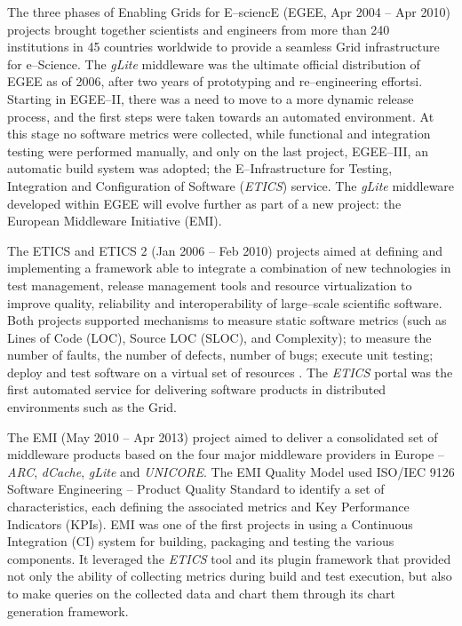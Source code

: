 \documentclass[journal]{IEEEtran}
\begin{document}
The three phases of Enabling Grids for E--sciencE (EGEE, Apr 2004 -- Apr 2010) \cite{cordis:egee, cordis:egee2, cordis:egee3} projects brought together scientists and engineers from more than 240 institutions in 45 countries worldwide to provide a seamless Grid infrastructure for e--Science. The {\sl gLite} middleware \cite{glite} was the ultimate official distribution of EGEE as of 2006, after two years of prototyping and re--engineering effortsi.
Starting in EGEE--II, there was a need to move to a more dynamic release process, and the first steps were taken towards an automated environment. At this stage no software metrics were collected, while functional and integration testing were performed manually, and only on the last project, EGEE--III, an automatic build system was adopted; the E--Infrastructure for Testing, Integration and Configuration of Software ({\sl ETICS}) service. The {\sl gLite} middleware developed within EGEE will evolve further as part of a new project: the European Middleware Initiative (EMI).

The ETICS \cite{cordis:etics} and ETICS 2 \cite{cordis:etics2} (Jan 2006 -- Feb 2010) projects aimed at defining and implementing a framework able to integrate a combination of new technologies in test management, release management tools and resource virtualization to improve quality, reliability and interoperability of large--scale scientific software. Both projects supported mechanisms to measure static software metrics (such as Lines of Code (LOC), Source LOC (SLOC), and Complexity); to measure the number of faults, the number of defects, number of bugs; execute unit testing; deploy and test software on a virtual set of resources \cite{etics}. The {\sl ETICS} portal was the first automated service for delivering software products in distributed environments such as the Grid.

The EMI (May 2010 -- Apr 2013) project \cite{cordis:emi} aimed to deliver a consolidated set of middleware products based on the four major middleware providers in Europe -- {\sl ARC}, {\sl dCache}, {\sl gLite} and {\sl UNICORE}. The EMI Quality Model used ISO/IEC 9126 Software Engineering -- Product Quality Standard \cite{iso9126} to identify a set of characteristics, each defining the associated metrics and Key Performance Indicators (KPIs). EMI was one of the first projects in using a Continuous Integration (CI) system for building, packaging and testing the various components. It leveraged the {\sl ETICS} tool and its plugin framework that provided not only the ability of collecting metrics during build and test execution, but also to make queries on the collected data and chart them through its chart generation framework.
\end{document}
